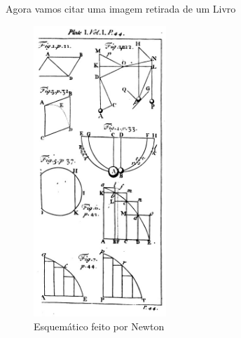 \documentclass{article}
\begin{document}
Agora vamos citar uma imagem retirada de um Livro

\begin{figure}[H]
    \centering
    \includegraphics[width=50mm]{../images/newton_drawing.jpg}
    \caption{Esquemático feito por Newton \cite[Plate I.Vol.I.P.44.]{newton1729mathematical}}
\end{figure}




\end{document}
